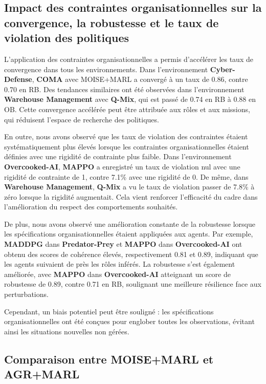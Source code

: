 \documentclass[final]{jfsma}
\begin{document}
\subsection{Impact des contraintes organisationnelles sur la convergence, la robustesse et le taux de violation des politiques}

L'application des contraintes organisationnelles a permis d'accélérer les taux de convergence dans tous les environnements. Dans l'environnement \textbf{Cyber-Defense}, \textbf{COMA} avec MOISE+MARL a convergé à un taux de 0.86, contre 0.70 en RB. Des tendances similaires ont été observées dans l'environnement \textbf{Warehouse Management} avec \textbf{Q-Mix}, qui est passé de 0.74 en RB à 0.88 en OB. Cette convergence accélérée peut être attribuée aux rôles et aux missions, qui réduisent l'espace de recherche des politiques.

En outre, nous avons observé que les taux de violation des contraintes étaient systématiquement plus élevés lorsque les contraintes organisationnelles étaient définies avec une rigidité de contrainte plus faible. Dans l'environnement \textbf{Overcooked-AI}, \textbf{MAPPO} a enregistré un taux de violation nul avec une rigidité de contrainte de 1, contre 7.1\% avec une rigidité de 0. De même, dans \textbf{Warehouse Management}, \textbf{Q-Mix} a vu le taux de violation passer de 7.8\% à zéro lorsque la rigidité augmentait. Cela vient renforcer l'efficacité du cadre dans l'amélioration du respect des comportements souhaités.

De plus, nous avons observé une amélioration constante de la robustesse lorsque les spécifications organisationnelles étaient appliquées aux agents. Par exemple, \textbf{MADDPG} dans \textbf{Predator-Prey} et \textbf{MAPPO} dans \textbf{Overcooked-AI} ont obtenu des scores de cohérence élevés, respectivement 0.81 et 0.89, indiquant que les agents suivaient de près les rôles inférés. La robustesse s'est également améliorée, avec \textbf{MAPPO} dans \textbf{Overcooked-AI} atteignant un score de robustesse de 0.89, contre 0.71 en RB, soulignant une meilleure résilience face aux perturbations.

Cependant, un biais potentiel peut être souligné : les spécifications organisationnelles ont été conçues pour englober toutes les observations, évitant ainsi les situations nouvelles non gérées.

\subsection{Comparaison entre MOISE+MARL et AGR+MARL}
\end{document}
